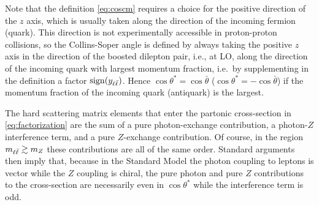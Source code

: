 Note that the definition
\cref{eq:coscm} requires a choice for the positive direction of
the $z$ axis, which is usually taken along the direction of the
incoming fermion (quark).
%
This direction is  not experimentally accessible in proton-proton collisions,
so the Collins-Soper angle is defined by always
taking the positive $z$ axis in the direction of the boosted dilepton
pair, i.e., at LO, along the direction of the incoming quark with
largest momentum fraction, i.e.\ by supplementing in the definition
a factor $\operatorname{sign}(y_{\ell\bar{\ell}})$.
%
Hence $\cos\theta^*=\cos{\bar\theta}$ ($\cos\theta^*=-\cos{\bar\theta}$)  if
the momentum fraction of the incoming quark (antiquark) is the largest.

%
The hard scattering matrix elements that enter the partonic cross-section
in \cref{eq:factorization} are the sum of a pure photon-exchange
contribution, a photon-$Z$ interference term, and a pure $Z$-exchange
contribution.
%
Of course, in the region
$m_{\ell\bar{\ell}} \gtrsim m_Z$ these contributions are all of the same order.
%
Standard arguments~\cite{Peskin:1995ev} then imply that, because in the
Standard Model the photon
coupling to leptons is vector  while the $Z$ coupling is chiral,
the pure photon and pure $Z$ contributions to the cross-section are
necessarily  even in $\cos\theta^*$ while the interference term is
odd.

